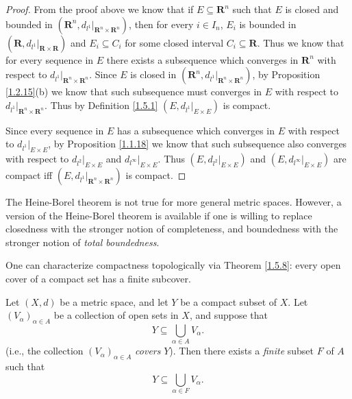 \begin{proof}
    From the proof above we know that if \(E \subseteq \mathbf{R}^n\) such that \(E\) is closed and bounded in \((\mathbf{R}^n, d_{l^1}|_{\mathbf{R}^n \times \mathbf{R}^n})\), then for every \(i \in I_n\), \(E_i\) is bounded in \((\mathbf{R}, d_{l^1}|_{\mathbf{R} \times \mathbf{R}})\) and \(E_i \subseteq C_i\) for some closed interval \(C_i \subseteq \mathbf{R}\).
    Thus we know that for every sequence in \(E\) there exists a subsequence which converges in \(\mathbf{R}^n\) with respect to \(d_{l^1}|_{\mathbf{R}^n \times \mathbf{R}^n}\).
    Since \(E\) is closed in \((\mathbf{R}^n, d_{l^1}|_{\mathbf{R}^n \times \mathbf{R}^n})\), by Proposition \ref{1.2.15}(b) we know that such subsequence must converges in \(E\) with respect to \(d_{l^1}|_{\mathbf{R}^n \times \mathbf{R}^n}\).
    Thus by Definition \ref{1.5.1} \((E, d_{l^1}|_{E \times E})\) is compact.

    Since every sequence in \(E\) has a subsequence which converges in \(E\) with respect to \(d_{l^1}|_{E \times E}\), by Proposition \ref{1.1.18} we know that such subsequence also converges with respect to \(d_{l^2}|_{E \times E}\) and \(d_{l^\infty}|_{E \times E}\).
    Thus \((E, d_{l^2}|_{E \times E})\) and \((E, d_{l^\infty}|_{E \times E})\) are compact iff \((E, d_{l^1}|_{\mathbf{R}^n \times \mathbf{R}^n})\) is compact.
\end{proof}

\begin{note}
    The Heine-Borel theorem is not true for more general metric spaces.
    However, a version of the Heine-Borel theorem is available if one is willing to replace closedness with the stronger notion of completeness, and boundedness with the stronger notion of \emph{total boundedness}.
\end{note}

\begin{note}
    One can characterize compactness topologically via Theorem \ref{1.5.8}:
    every open cover of a compact set has a ﬁnite subcover.
\end{note}

\begin{theorem}\label{1.5.8}
    Let \((X, d)\) be a metric space, and let \(Y\) be a compact subset of \(X\).
    Let \((V_{\alpha})_{\alpha \in A}\) be a collection of open sets in \(X\), and suppose that
    \[
        Y \subseteq \bigcup_{\alpha \in A} V_{\alpha}.
    \]
    (i.e., the collection \((V_{\alpha})_{\alpha \in A}\) \emph{covers} \(Y\)).
    Then there exists a \emph{finite} subset \(F\) of \(A\) such that
    \[
        Y \subseteq \bigcup_{\alpha \in F} V_{\alpha}.
    \]
\end{theorem}

